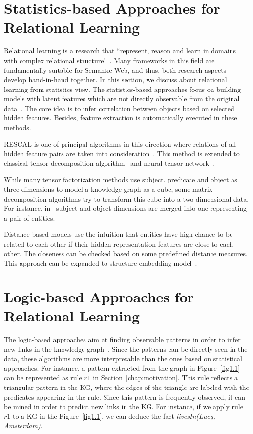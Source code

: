\section{Statistics-based Approaches for Relational Learning}

Relational learning is a research that ``represent, reason and learn in domains with complex relational structure"~\cite{ref43}. Many frameworks in this field are fundamentally suitable for Semantic Web, and thus, both research aspects develop hand-in-hand together. In this section, we discuss about relational learning from statistics view. The statistics-based approaches focus on building models with latent features which are not directly observable from the original data~\cite{ref1}. The core idea is to infer correlation between objects based on selected hidden features. Besides, feature extraction is automatically executed in these methods.

RESCAL is one of principal algorithms in this direction where relations of all hidden feature pairs are taken into consideration~\cite{ref2, ref3}. This method is extended to classical tensor decomposition algorithm~\cite{ref4} and neural tensor network~\cite{ref5}.

While many tensor factorization methods use subject, predicate and object as three dimensions to model a knowledge graph as a cube, some matrix decomposition algorithms try to transform this cube into a two dimensional data. For instance, in~\cite{ref6, ref7} subject and object dimensions are merged into one representing a pair of entities.

Distance-based models use the intuition that entities have high chance to be related to each other if their hidden representation features are close to each other. The closeness can be checked based on some predefined distance measures. This approach can be expanded to structure embedding model~\cite{ref8}.

\section{Logic-based Approaches for Relational Learning}

The logic-based approaches aim at finding observable patterns in order to infer new links in the knowledge graph~\cite{ref1}. Since the patterns can be directly seen in the data, these algorithms are more interpretable than the ones based on statistical approaches. For instance, a pattern extracted from the graph in Figure~\ref{fig1.1} can be represented as rule $r1$ in Section~\ref{chap:motivation}. This rule reflects a triangular pattern in the KG, where the edges of the triangle are labeled with the predicates appearing in the rule. Since this pattern is frequently observed, it can be mined in order to predict new links in the KG. For instance, if we apply rule $r1$ to a KG in the Figure~\ref{fig1.1}, we can deduce the fact \textit{livesIn(Lucy, Amsterdam)}.

